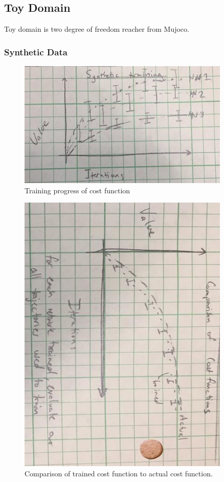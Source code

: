 \subsection{Toy Domain}
Toy domain is two degree of freedom reacher from Mujoco.

\subsubsection{Synthetic Data}
\begin{figure}[h]
    \centering
    \includegraphics[width=0.9\textwidth]{Images/ToySyntheticTrainingAccuracy.jpg}
    \caption{Training progress of cost function}
    \label{fig:ToySyntheticTraningAccuracy}
\end{figure}

\begin{figure}[h]
    \centering
    \includegraphics[width=0.9\textwidth]{Images/ToySyntheticCostComparison.jpg}
    \caption{Comparison of trained cost function to actual cost function.}
    \label{fig:ToySyntheticCostComparison}
\end{figure}

